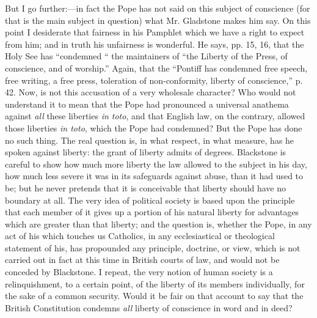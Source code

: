 But I go further:—in fact the Pope has not said on this subject of
conscience (for that is the main subject in question) what Mr. Gladstone
makes him say. On this point I desiderate that fairness in his Pamphlet
which we have a right to expect from him; and in truth his unfairness is
wonderful. He says, pp. 15, 16, that the Holy See has ``condemned
`` the maintainers of ``the Liberty of the Press, of
conscience, and of worship.'' Again, that the ``Pontiff has
condemned free speech, free writing, a free press, toleration of
non-conformity, liberty of conscience,'' p. 42. Now, is not this
accusation of a very wholesale character? Who would not understand it to
mean that the Pope had pronounced a universal anathema against \emph{all}
these liberties \emph{in toto}, and that English law, on the contrary,
allowed those liberties \emph{in toto}, which the Pope had condemned?
But the Pope has done no such thing. The real question is, in what
respect, in what measure, has he spoken against liberty: the grant of
liberty admits of degrees. Blackstone is careful to show how much more
liberty the law allowed to the subject in his day, how much less severe
it was in its safeguards against abuse, than it had used to be; but he
never pretends that it is conceivable that liberty should have no
boundary at all. The very idea of political society is based upon the
principle that each member of it gives up a portion of his natural
liberty for advantages which are greater than that liberty; and the
question is, whether the Pope, in any act of his which touches us
Catholics, in any ecclesiastical or theological statement of his, has
propounded any principle, doctrine, or view, which is not carried out in
fact at this time in British courts of law, and would not be conceded by
Blackstone. I repeat, the very notion of human society is a
relinquishment, to a certain point, of the liberty of its members
individually, for the sake of a common security. Would it be fair on
that account to say that the British Constitution condemns \emph{all} liberty
of conscience in word and in deed?

